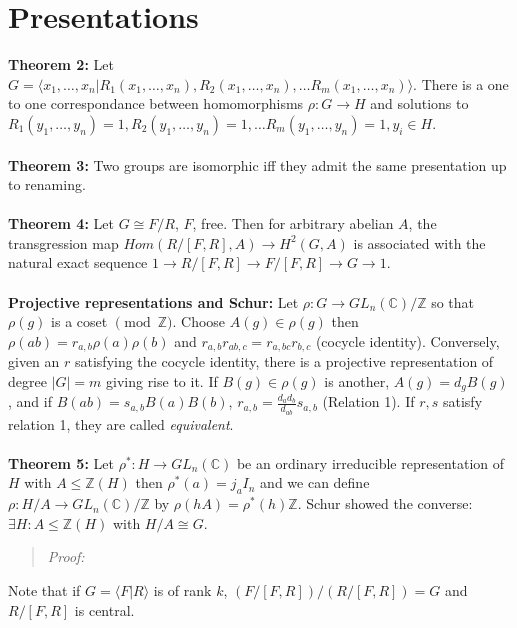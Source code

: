 \section {Presentations}
{\bf Theorem 2:}  Let $G= 
\langle x_1, \ldots, x_n| R_1(x_1, \ldots, x_n), R_2(x_1, \ldots, x_n), \ldots R_m(x_1, \ldots, x_n)
\rangle
$. There is a one to one correspondance between homomorphisms
$\rho: G \rightarrow H$ and solutions to 
$R_1(y_1, \ldots, y_n)=1, R_2(y_1, \ldots, y_n)=1, \ldots R_m(y_1, \ldots, y_n)=1, y_i \in H$.
\\
\\
{\bf Theorem 3:}  Two groups are isomorphic iff they admit the same presentation up to renaming.
\\
\\
{\bf Theorem 4:}  Let $G \cong F/R$, $F$, free.  Then for arbitrary abelian $A$, the transgression map
$Hom(R/[F,R],A) \rightarrow H^2(G,A)$ is associated with the natural exact sequence
$1 \rightarrow R/[F,R] \rightarrow F/[F, R] \rightarrow G \rightarrow 1$.
\\
\\
{\bf Projective representations and Schur:} Let $\rho: G \rightarrow GL_n({\mathbb C})/{\mathbb Z}$
so that $\rho(g)$ is a coset $\pmod {\mathbb Z}$.  Choose $A(g) \in \rho(g)$ then
$\rho(ab)= r_{a,b} \rho(a) \rho(b)$ and $r_{a,b} r_{ab,c}= r_{a, bc} r_{b,c}$ (cocycle identity).
Conversely, given an $r$ satisfying the cocycle identity, there is a projective representation
of degree $|G|=m$ giving rise to it.  If $B(g) \in \rho(g)$ is another, $A(g)= d_g B(g)$, and
if $B(ab)= s_{a,b}B(a)B(b)$, $r_{a,b}= {\frac {d_a d_b} {d_{ab}}} s_{a,b}$ (Relation 1).
If $r, s$ satisfy relation 1, they are called \emph{equivalent}.
\\
\\
{\bf Theorem 5:} Let $\rho^*: H \rightarrow GL_n({\mathbb C})$ be an ordinary irreducible
representation of $H$ with $A \le {\mathbb Z}(H)$ then $\rho^*(a)= j_a I_n$ and we can
define $\rho: H/A \rightarrow GL_n({\mathbb C})/{\mathbb Z}$ by
$\rho(hA)= \rho^*(h) {\mathbb Z}$.  Schur showed the converse: 
$\exists H: A \le {\mathbb Z}(H)$ with $H/A \cong G$.
\begin{quote}
\emph{Proof:}  
\end{quote}
Note that if $G= \langle F|R \rangle $ is of rank $k$, 
$(F/[F,R])/(R/[F,R])= G$ and $R/[F,R]$ is central.
